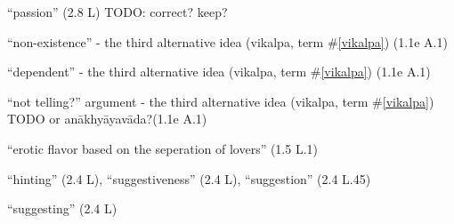 \documentclass[10pt]{article}
\begin{document}
\begin{multicols}{2}
\begin{enumerate}[
			leftmargin=0em,
			rightmargin=0em,
		]
		 ``passion'' (2.8 L) TODO: correct? keep?

		 ``non-existence'' - the third alternative idea (vikalpa, term \#\ref{vikalpa}) (1.1e A.1)

		 ``dependent'' - the third alternative idea (vikalpa, term \#\ref{vikalpa}) (1.1e A.1)

		 ``not telling?'' argument - the third alternative idea (vikalpa, term \#\ref{vikalpa}) TODO or anākhyāyavāda?(1.1e A.1)


		 ``erotic flavor based on the seperation of lovers'' (1.5 L.1)%


		 ``hinting'' (2.4 L),
		``suggestiveness'' (2.4 L),
		``suggestion'' (2.4 L.45)

		 ``suggesting'' (2.4 L)

	\end{enumerate}
\end{multicols}

\end{document}
